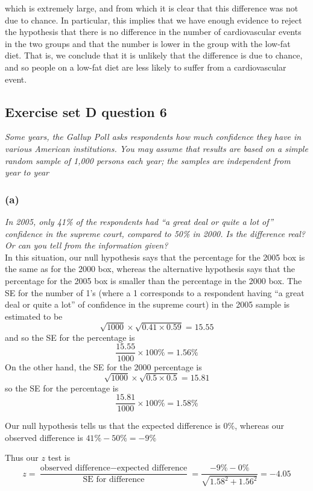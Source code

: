 \documentclass[11pt]{article}
\begin{document}
\noindent which is extremely large, and from which it is clear that this difference was not due to chance. In particular, this implies that we have enough evidence to reject the hypothesis that there is no difference in the number of cardiovascular events in the two groups and that the number is lower in the group with the low-fat diet. That is, we conclude that it is unlikely that the difference is due to chance, and so people on a low-fat diet are less likely to suffer from a cardiovascular event.

\subsection*{Exercise set D question 6} %
\noindent \textit{Some years, the Gallup Poll asks respondents how much confidence they have in various American institutions. You may assume that results are based on a simple random sample of 1,000 persons each year; the samples are independent from year to year}
\subsubsection*{(a)}
\noindent \textit{In 2005, only 41\% of the respondents had ``a great deal or quite a lot of'' confidence in the supreme court, compared to 50\% in 2000. Is the difference real? Or can you tell from the information given?}\\

\noindent In this situation, our null hypothesis says that the percentage for the 2005 box is the same as for the 2000 box, whereas the alternative hypothesis says that the percentage for the 2005 box is smaller than the percentage in the 2000 box. The SE for the number of 1's (where a 1 corresponds to a respondent having ``a great deal or quite a lot'' of confidence in the supreme court) in the 2005 sample is estimated to be
$$\sqrt{1000} \times \sqrt{0.41 \times 0.59} = 15.55$$
\noindent and so the SE for the percentage is
$$\frac{15.55}{1000} \times 100\% = 1.56\%$$
\noindent On the other hand, the SE for the 2000 percentage is
$$\sqrt{1000} \times \sqrt{0.5 \times 0.5} = 15.81$$
\noindent so the SE for the percentage is
$$\frac{15.81}{1000} \times 100\% = 1.58\%$$

\noindent Our null hypothesis tells us that the expected difference is $0\%$, whereas our observed difference is $41\% - 50\% = -9\%$

\noindent Thus our $z$ test is
$$z = \frac{\text{observed difference} - \text{expected difference}}{\text{SE for difference}} = \frac{ - 9\% - 0\%}{\sqrt{1.58^2 + 1.56^2}} = -4.05$$
\end{document}
